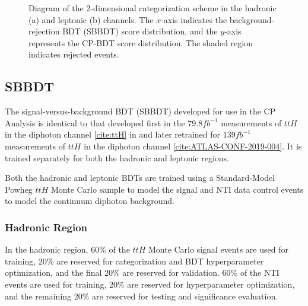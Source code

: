 \begin{figure}[htbp]
  \centering
  \caption{Diagram of the 2-dimensional categorization scheme in the hadronic (a) and leptonic (b) channels. The $x$-axis indicates the background-rejection BDT (SBBDT) score distribution, and the $y$-axis represents the CP-BDT score distribution. The shaded region indicates rejected events.}
  \label{fig:cartoon}
\end{figure}

\subsection{SBBDT}

The signal-versus-background BDT (SBBDT) developed for use in the CP Analysis is identical to that developed first in the $79.8 fb^{-1}$ measurements of $ttH$ in the diphoton channel \ref{cite:ttH} in and later retrained for $139 fb^{-1}$ measurements of $ttH$ in the diphoton channel \ref{cite:ATLAS-CONF-2019-004}. It is trained separately for both the hadronic and leptonic regions.

Both the hadronic and leptonic BDTs are trained using a Standard-Model Powheg $ttH$ Monte Carlo sample to model the signal and NTI data control events to model the continuum diphoton background.

\subsubsection{Hadronic Region} \label{sec:SBBDThad} 
In the hadronic region, 60\% of the $ttH$ Monte Carlo signal events are used for training, 20\% are reserved for categorization and BDT hyperparameter optimization, and the final 20\% are reserved for validation. 60\% of the NTI events are used for training, 20\% are reserved for hyperparameter optimization, and the remaining 20\% are reserved for testing and significance evaluation.

